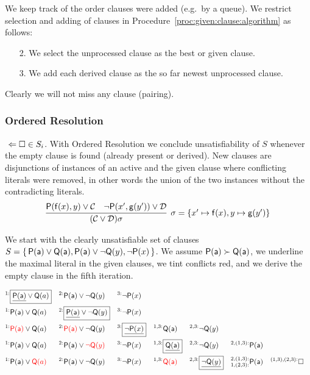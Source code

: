 \begin{definition}
	We keep track of the order clauses were added (e.g.\ by a queue).
	We restrict selection and adding of clauses
	in Procedure~\ref{proc:given:clause:algorithm} as follows:
	\begin{enumerate}
		\item[2.]
		We select the  unprocessed clause as the best or given clause.
		\item[3.]
		We add each derived clause
		as the so far newest unprocessed clause.
	\end{enumerate}
Clearly we will not miss any clause (pairing).
\end{definition}

\subsubsection{Ordered Resolution}

\jek{} \( \ \Leftarrow\square\in S_i \).
With Ordered Resolution we conclude unsatisfiability of \( S \) whenever the empty clause is found (already present or derived).
New clauses are disjunctions of instances of an active and the given clause where conflicting literals were removed,
in other words the union of the two instances without the contradicting literals.
\begin{gather*}
\infer[\sigma=\{ x'\mapsto\mf(x), y\mapsto\mg(y') \}]{
	(\mcC \lor \mcD)\sigma
}{
	\mP(\mf(x), y) \lor \mcC & \lnot\mP(x',\mg(y')) \lor \mcD
}
\end{gather*}

\begin{example}
	We start with the clearly unsatisfiable set of clauses
\( S=\{ \, \mathsf{P}(\mathsf{a})\lor\mathsf{Q}(\mathsf{a}), \mathsf{P}(\mathsf{a})\lor\lnot\mathsf{Q}(y), \lnot\mathsf{P}(x) \, \} \).
	We assume \( \mathsf{P}(\mathsf{a})\succ\mathsf{Q}(\mathsf{a}) \),
	we underline the maximal literal in the given clauses,
	we tint conflicts red,
	 and we derive the empty clause in the fifth iteration.

	\begin{align*}
	^{1:}&\boxed{\underline{\mP(\ma)}\lor\mQ(a)}
	& ^{2:}&\mP(\ma)\lor\lnot\mQ(y) & ^{3:}&\lnot\mP(x)
	\\
	^{1:}&\mP(\ma)\lor\mQ(a)
	& ^{2:}&\boxed{\underline{\mP(\ma)}\lor\lnot\mQ(y)} & ^{3:}&\lnot\mP(x)
	\\
	^{1:}&{\colLo\mP(\ma)}\lor\mQ(a)
	& ^{2:}&{\colLo\mP(\ma)}\lor\lnot\mQ(y)
	& ^{3:}&\boxed{\underline{\lnot\mP(x)}}
	& ^{1,3:}&\mQ(\ma)
	& ^{2,3:}&\lnot\mQ(y)
	\\
	^{1:}&\mP(\ma)\lor\mQ(a)
	& ^{2:}&\mP(\ma)\lor{\colLo\lnot\mQ(y)}
	& ^{3:}&\lnot\mP(x)
	& ^{1,3:}&\boxed{\underline{\mQ(\ma)}}
	& ^{2,3:}&\lnot\mQ(y)
	& ^{2,(1,3):}&\mP(\ma)
	\\
	^{1:}&\mP(\ma)\lor{\colLo\mQ(a)}
	& ^{2:}&\mP(\ma)\lor\lnot\mQ(y)
	& ^{3:}&\lnot\mP(x)
	& ^{1,3:}&\colLo\mQ(\ma)
	& ^{2,3:}&\boxed{\underline{\lnot\mQ(y)}}
	& ^{2,(1,3):}_{1,(2,3):}&\mP(\ma)
	& ^{(1,3),(2,3):}&\emptyclause
	\\
	\end{align*}
\end{example}

